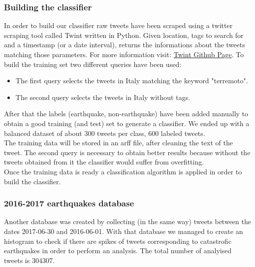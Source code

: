 \documentclass[a4paper, oneside]{article}
\begin{document}
\subsubsection{Building the classifier}
In order to build our classifier raw tweets have been scraped using a twitter scraping tool called Twint written in Python. Given location, tags to search for and a timestamp  (or a date interval), returns the informations about the tweets matching those parameters. For more information visit: \textcolor{blue}{\href{https://www.github.com/twintproject/twint}{Twint Github Page}}. To build the training set two different queries have been used: 
\begin{itemize}
\item The first query selects the tweets in Italy matching the keyword "terremoto".
\item The second query selects the tweets in Italy without tags.
\end{itemize} 
After that the labels (earthquake, non-earthquake) have been added manually to obtain a good training (and test) set to generate a classifier. We ended up with a balanced dataset of about 300 tweets per class, 600 labeled tweets.\\
The training data will be stored in an arff file, after cleaning the text of the tweet. The second query is necessary to obtain better results because without the tweets obtained from it the classifier would suffer from overfitting.\\
Once the training data is ready a classification algorithm is applied in order to build the classifier.

\subsubsection{2016-2017 earthquakes database}
Another database was created by collecting (in the same way) tweets between the dates 2017-06-30 and 2016-06-01. With that database we managed to create an histogram to check if there are spikes of tweets corresponding to catastrofic earthquakes in order to perform an analysis. The total number of analyised tweets is 304307.
\end{document}
